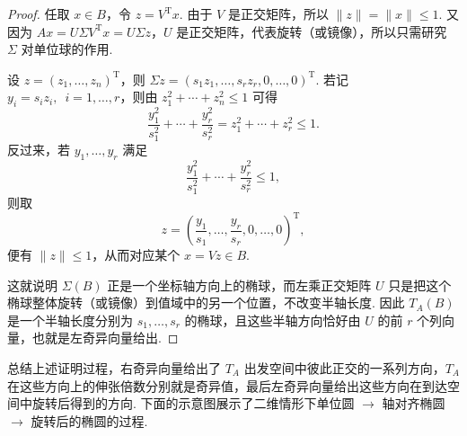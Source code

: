 \begin{proof}
    任取 $x \in B$，令 $z = V^{\mathrm{T}}x$. 由于 $V$ 是正交矩阵，所以 $\lVert z \rVert = \lVert x \rVert \leqslant 1$. 又因为 $Ax = U\Sigma V^{\mathrm{T}}x = U\Sigma z$，$U$ 是正交矩阵，代表旋转（或镜像），所以只需研究 $\Sigma$ 对单位球的作用.

    设 $z = (z_1, \ldots, z_n)^{\mathrm{T}}$，则 $\Sigma z = (s_1z_1, \ldots, s_rz_r, 0, \ldots, 0)^{\mathrm{T}}$. 若记 $y_i = s_i z_i,\enspace i = 1, \ldots, r$，则由 $z_1^2 + \cdots + z_n^2 \leqslant 1$ 可得
    \[
        \frac{y_1^2}{s_1^2} + \cdots + \frac{y_r^2}{s_r^2}
        = z_1^2 + \cdots + z_r^2
        \leqslant 1.
    \]
    反过来，若 $y_1, \ldots, y_r$ 满足
    \[
        \frac{y_1^2}{s_1^2} + \cdots + \frac{y_r^2}{s_r^2} \leqslant 1,
    \]
    则取
    \[
        z = \left( \frac{y_1}{s_1}, \ldots, \frac{y_r}{s_r}, 0, \ldots, 0 \right)^{\mathrm{T}},
    \]
    便有 $\lVert z \rVert \leqslant 1$，从而对应某个 $x = Vz \in B$.

    这就说明 $\Sigma(B)$ 正是一个坐标轴方向上的椭球，而左乘正交矩阵 $U$ 只是把这个椭球整体旋转（或镜像）到值域中的另一个位置，不改变半轴长度. 因此 $T_A(B)$ 是一个半轴长度分别为 $s_1, \ldots, s_r$ 的椭球，且这些半轴方向恰好由 $U$ 的前 $r$ 个列向量，也就是左奇异向量给出.
\end{proof}

总结上述证明过程，右奇异向量给出了 $T_A$ 出发空间中彼此正交的一系列方向，$T_A$ 在这些方向上的伸张倍数分别就是奇异值，最后左奇异向量给出这些方向在到达空间中旋转后得到的方向. 下面的示意图展示了二维情形下单位圆 $\to$ 轴对齐椭圆 $\to$ 旋转后的椭圆的过程.

